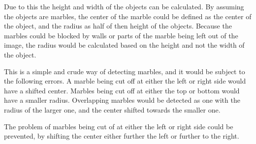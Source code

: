 \documentclass[../Head/Main.tex]{subfiles}
\begin{document}
Due to this the height and width of the objects can be calculated. By assuming the objects are marbles, the center of the marble could be defined as the center of the object, and the radius as half of then height of the objects. Because the marbles could be blocked by walls or parts of the marble being left out of the image, the radius would be calculated based on the height and not the width of the object.\par 

This is a simple and crude way of detecting marbles, and it would be subject to the following errors. A marble being cut off at either the left or right side would have a shifted center. Marbles being cut off at either the top or bottom would have a smaller radius. Overlapping marbles would be detected as one with the radius of the larger one, and the center shifted towards the smaller one.\par 
The problem of marbles being cut of at either the left or right side could be prevented, by shifting the center either further the left or further to the right.
   
 
\end{document}
